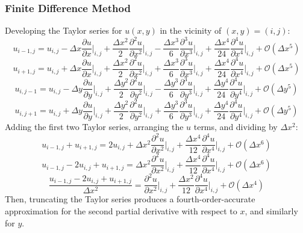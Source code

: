 \documentclass[10pt]{article}		%
\numberwithin{equation}{section}
\newcommand{\pder}[2]{\frac{\partial#1}{\partial#2}}			%
\newcommand{\psder}[2]{\dfrac{\partial^2#1}{\partial#2^2}}		%
\newcommand{\ptder}[2]{\dfrac{\partial^3#1}{\partial#2^3}}		%
\newcommand{\pfder}[2]{\dfrac{\partial^4#1}{\partial#2^4}}		%
\begin{document}
\subsubsection{Finite Difference Method}
Developing the Taylor series for $u(x, y)$ in the vicinity of $(x,y) = (i,j)$:
\begin{equation}
u_{i-1, j} = u_{i,j} - \Delta x \pder{u}{x}\Big|_{i,j} + \frac{\Delta x^2}{2} \psder{u}{x}\Big|_{i,j} - \frac{\Delta x^3}{6} \ptder{u}{x}\Big|_{i,j} + \frac{\Delta x^4}{24} \pfder{u}{x}\Big|_{i,j} + \mathcal{O}(\Delta x^5)
\end{equation}
\begin{equation}
u_{i+1, j} = u_{i,j} + \Delta x \pder{u}{x}\Big|_{i,j} + \frac{\Delta x^2}{2} \psder{u}{x}\Big|_{i,j} + \frac{\Delta x^3}{6} \ptder{u}{x}\Big|_{i,j} + \frac{\Delta x^4}{24} \pfder{u}{x}\Big|_{i,j} + \mathcal{O}(\Delta x^5)
\end{equation}
\begin{equation}
u_{i, j-1} = u_{i,j} - \Delta y \pder{u}{y}\Big|_{i,j} + \frac{\Delta y^2}{2} \psder{u}{y}\Big|_{i,j} - \frac{\Delta y^3}{6} \ptder{u}{y}\Big|_{i,j} + \frac{\Delta y^4}{24} \pfder{u}{y}\Big|_{i,j} + \mathcal{O}(\Delta y^5)
\end{equation}
\begin{equation}
u_{i, j+1} = u_{i,j} + \Delta y \pder{u}{y}\Big|_{i,j} + \frac{\Delta y^2}{2} \psder{u}{y}\Big|_{i,j} + \frac{\Delta y^3}{6} \ptder{u}{y}\Big|_{i,j} + \frac{\Delta y^4}{24} \pfder{u}{y}\Big|_{i,j} + \mathcal{O}(\Delta y^5)
\end{equation}
Adding the first two Taylor series, arranging the $u$ terms, and dividing by $\Delta x^2$:
\begin{equation}
u_{i-1, j} + u_{i+1, j} = 2u_{i,j} + {\Delta x^2} \psder{u}{x}\Big|_{i,j} + \frac{\Delta x^4}{12} \pfder{u}{x}\Big|_{i,j} + \mathcal{O}(\Delta x^6)
\end{equation}
\begin{equation}
u_{i-1, j} - 2u_{i,j} + u_{i+1, j} = {\Delta x^2} \psder{u}{x}\Big|_{i,j} + \frac{\Delta x^4}{12} \pfder{u}{x}\Big|_{i,j} + \mathcal{O}(\Delta x^6)
\end{equation}
\begin{equation}
\frac{u_{i-1, j} - 2u_{i,j} + u_{i+1, j}}{\Delta x^2} = \psder{u}{x}\Big|_{i,j} + \frac{\Delta x^2}{12} \pfder{u}{x}\Big|_{i,j} + \mathcal{O}(\Delta x^4)
\end{equation}
Then, truncating the Taylor series produces a fourth-order-accurate approximation for the second partial derivative with respect to $x$, and similarly for $y$.
\end{document}
